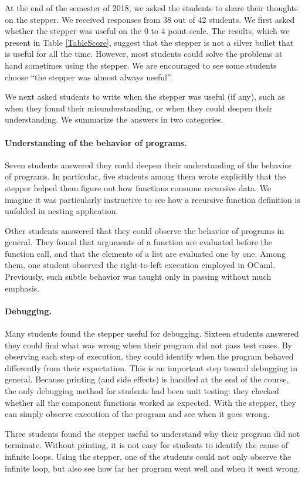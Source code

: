 At the end of the semester of 2018, we asked the students to share
their thoughts on the stepper.
We received responses from 38 out of 42 students.
We first asked whether the stepper was useful on the 0 to 4 point scale.
The results, which we present in Table \ref{TableScore}, suggest
that the stepper is not a silver bullet that is useful
for all the time.
However, most students could solve the problems at hand sometimes
using the stepper.
We are encouraged to see some students choose ``the stepper was almost always useful''.

We next asked students to write when the stepper was useful (if any),
such as when they found their misunderstanding, or when they could
deepen their understanding.
We summarize the answers in two categories.

\paragraph{Understanding of the behavior of programs.}
Seven students answered they could deepen their understanding of
the behavior of programs.
In particular, five students among them wrote explicitly that the
stepper helped them figure out how functions consume recursive data.
We imagine it was particularly instructive to see how a recursive 
function definition is unfolded in nesting application.

Other students answered that they could observe the behavior of
programs in general.
They found that arguments of a function are evaluated before the
function call, and that the elements of a list are evaluated one by one.
Among them, one student observed the right-to-left execution
employed in OCaml.
Previously, such subtle behavior was taught only in passing without
much emphasis.

\paragraph{Debugging.}
Many students found the stepper useful for debugging.
Sixteen students answered they could find what was wrong when their
program did not pass test cases.
By observing each step of execution, they could identify when the
program behaved differently from their expectation.
This is an important step toward debugging in general.
Because printing (and side effects) is handled at the end of the
course, the only debugging method for students had been unit testing:
they checked whether all the component functions worked as expected.
With the stepper, they can simply observe execution of the program and
see when it goes wrong.

Three students found the stepper useful to understand why their
program did not terminate.
Without printing, it is not easy for students to identify the cause of
infinite loops.
Using the stepper, one of the students could not only observe
the infinite loop, but also see how far her program went well
and when it went wrong.
